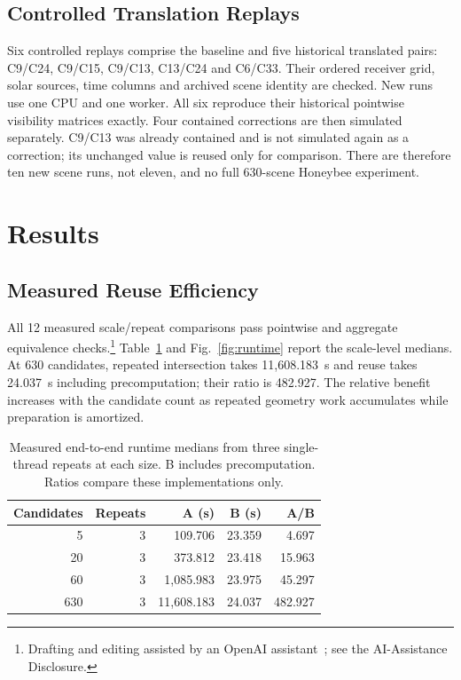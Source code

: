 \documentclass{llncs}
\newcommand{\aidraft}{\footnote{Drafting and editing assisted by an OpenAI assistant~\cite{openai2026}; see the AI-Assistance Disclosure.}}
\begin{document}
\subsection{Controlled Translation Replays}
Six controlled replays comprise the baseline and five historical translated pairs: C9/C24, C9/C15, C9/C13, C13/C24 and C6/C33. Their ordered receiver grid, solar sources, time columns and archived scene identity are checked. New runs use one CPU and one worker. All six reproduce their historical pointwise visibility matrices exactly. Four contained corrections are then simulated separately. C9/C13 was already contained and is not simulated again as a correction; its unchanged value is reused only for comparison. There are therefore ten new scene runs, not eleven, and no full 630-scene Honeybee experiment.

\section{Results}
\subsection{Measured Reuse Efficiency}
All 12 measured scale/repeat comparisons pass pointwise and aggregate equivalence checks.\aidraft{} Table~\ref{tab:runtime} and Fig.~\ref{fig:runtime} report the scale-level medians. At 630 candidates, repeated intersection takes 11,608.183~s and reuse takes 24.037~s including precomputation; their ratio is 482.927. The relative benefit increases with the candidate count as repeated geometry work accumulates while preparation is amortized.

\begin{table}[tbp]
\caption{Measured end-to-end runtime medians from three single-thread repeats at each size. B includes precomputation. Ratios compare these implementations only.}
\label{tab:runtime}\centering
\begin{tabular}{rrrrr}\toprule
Candidates & Repeats & A (s) & B (s) & A/B\\\midrule
5 & 3 & 109.706 & 23.359 & 4.697\\
20 & 3 & 373.812 & 23.418 & 15.963\\
60 & 3 & 1,085.983 & 23.975 & 45.297\\
630 & 3 & 11,608.183 & 24.037 & 482.927\\\bottomrule
\end{tabular}
\end{table}
\end{document}
